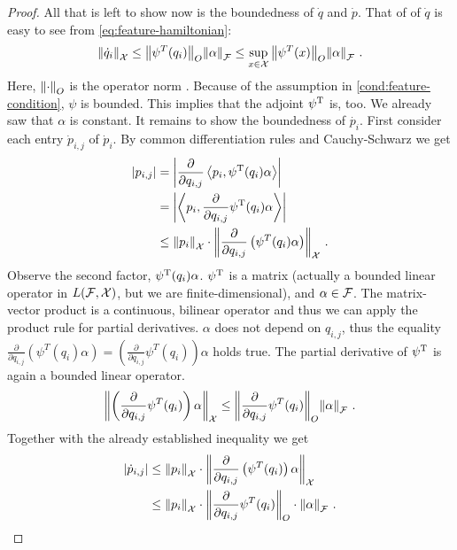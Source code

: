 \begin{proof}
	All that is left to show now is the boundedness of $\dot{q}$ and $\dot{p}$.
	That of of $\dot{q}$ is easy to see from \cref{eq:feature-hamiltonian}:
	\begin{equation}
		\norm{\dot{q}_i}_\cX \leq \norm{\psi^T(q_i)}_O \norm{\alpha}_\cF 
		\leq \sup_{x \in \cX}\norm{\psi^T(x)}_O \norm{\alpha}_\cF\ .
	\end{equation}
	Here, $\norm{\cdot}_O$ is the operator norm \cite{conway07}.
	Because of the assumption in \cref{cond:feature-condition}, $\psi$ is bounded.
	This implies that the adjoint $\psi^{\mathrm{T}}$ is, too.
	We already saw that $\alpha$ is constant.
	It remains to show the boundedness of $\dot{p_i}$.
	First consider each entry $\dot{p}_{i, j}$ of $\dot{p}_i$.
	By common differentiation rules and Cauchy-Schwarz we get
	\begin{align}
		\abs{p_{i,j}} &= \abs{\frac{\partial}{\partial q_{i, j}}\left<p_i, \psi^{\mathrm{T}}(q_i) \alpha \right> }\\
		&= \abs{\left<p_i, \frac{\partial}{\partial q_{i, j}} \psi^{\mathrm{T}}(q_i) \alpha \right> }\\
		&\leq \norm{p_i}_{\mathcal{X}} \cdot \norm{\frac{\partial}{\partial q_{i, j}} \left(\psi^T(q_i) \alpha\right) }_{\mathcal{X}} \ .
	\end{align}
	Observe the second factor, $\psi^{\mathrm{T}}(q_i) \alpha$. $\psi^{\mathrm{T}}$ is a matrix (actually a bounded linear operator in $L(\mathcal{F}, \mathcal{X})$, but we are finite-dimensional), and $\alpha \in \mathcal{F}$.
	The matrix-vector product is a continuous, bilinear operator and thus we can apply the product rule for partial derivatives.
	$\alpha$ does not depend on $q_{i, j}$, thus the equality $\frac{\partial}{\partial q_{i, j}} \left(\psi^T(q_i) \alpha\right) = \left(\frac{\partial}{\partial q_{i, j}} \psi^T(q_i)\right)  \alpha$ holds true. The partial derivative of $\psi^{\mathrm{T}}$ is again a bounded linear operator.
	\begin{equation}
		\norm{\left(\frac{\partial}{\partial q_{i, j}} \psi^T(q_i)\right)  \alpha}_{\mathcal{X}} \leq \norm{\frac{\partial}{\partial q_{i, j}} \psi^T(q_i)}_O \norm{\alpha}_{\mathcal{F}} \ .
	\end{equation}
	Together with the already established inequality we get
	\begin{align}
		\abs{\dot{p}_{i,j}} &\leq \norm{p_i}_{\mathcal{X}} \cdot \norm{\frac{\partial}{\partial q_{i, j}} \left(\psi^T(q_i)\right) \alpha }_{\mathcal{X}}\\
		&\leq  \norm{p_i}_{\mathcal{X}} \cdot \norm{\frac{\partial}{\partial q_{i, j}} \psi^T(q_i)}_O \cdot \norm{\alpha }_{\mathcal{F}} \ .
	\end{align}

\end{proof}
